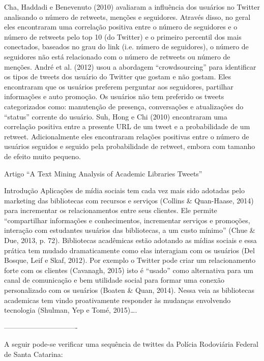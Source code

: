 Cha, Haddadi e Benevenuto (2010) avaliaram a influência dos usuários no Twitter analisando o número de retweets, menções e seguidores. Através disso, no geral eles encontraram uma correlação positiva entre o número de seguidores e o número de retweets pelo top 10 (do Twitter) e o primeiro percentil dos mais conectados, baseados no grau do link (i.e. número de seguidores), o número de seguidores não está relacionado com o número de retweets ou número de menções. André et al. (2012) usou a abordagem “crowdsourcing” para identificar os tipos de tweets dos usuário do Twitter que gostam e não gostam. Eles encontraram que os usuários preferem perguntar aos seguidores, partilhar informações e auto promoção. Os usuários não tem preferido os tweets categorizados como: manutenção de presença, conversações e atualizações do “status” corrente do usuário.
Suh, Hong e Chi (2010) encontraram uma correlação positiva entre a presente URL de um tweet e a probabilidade de um retweet. Adicionalmente eles encontraram relações positivas entre o número de usuários seguidos e seguido pela probabilidade de retweet, embora com tamanho de efeito muito pequeno.

Artigo “A Text Mining Analysis of Academic Libraries Tweets”


Introdução
Aplicações de mídia sociais tem cada vez mais sido adotadas pelo marketing das bibliotecas com recursos e serviços (Collins \& Quan-Haase, 2014) para incrementar os relacionamentos entre seus  clientes. Ele permite “compartilhar informações e conhecimentos, incrementar serviços e promoções, interação com estudantes usuários das bibliotecas, a um custo mínimo” (Chue \& Due, 2013, p. 72). Bibliotecas acadêmicas estão adotando as mídias sociais e essa prática tem mudado dramaticamente como elas interagiam com os usuários (Del Bosque, Leif e Skaf, 2012). Por exemplo o Twitter pode criar um relacionamento forte com os clientes (Cavanagh, 2015) isto é “usado” como alternativa para um canal de comunicação e bem utilidade social para formar uma conexão personalizado com os usuários (Boaten \& Quan, 2014).
Nessa veia as bibliotecas academicas tem vindo proativamente responder às mudanças envolvendo tecnologia (Shulman, Yep e Tomé, 2015)….

-------------------------------

A seguir pode-se verificar uma sequência de twittes da Polícia Rodoviária Federal de Santa Catarina:

